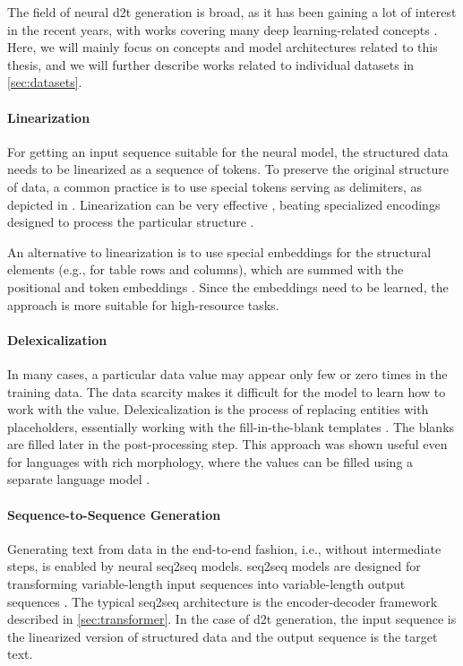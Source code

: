 The field of neural \ac{d2t} generation is broad, as it has been gaining a lot of interest in the recent years, with works covering many deep learning-related concepts \cite{sharmaInnovationsNeuralDatatotext2022, lin2023survey}. Here, we will mainly focus on concepts and model architectures related to this thesis, and we will further describe works related to individual datasets in \autoref{sec:datasets}.


\paragraph{Linearization} For getting an input sequence suitable for the neural model, the structured data needs to be linearized as a sequence of tokens. To preserve the original structure of data, a common practice is to use special tokens serving as delimiters, as depicted in . Linearization can be very effective \cite{yang2020improving,hoyle2021promoting,xieUnifiedSKGUnifyingMultiTasking2022}, beating specialized encodings designed to process the particular structure \cite{marcheggianiDeepGraphConvolutional2018,koncel-kedziorskiTextGenerationKnowledge2019}.

An alternative to linearization is to use special embeddings for the structural elements (e.g., for table rows and columns), which are summed with the positional and token embeddings \cite{wang2021tuta,yangTableFormerRobustTransformer2022}. Since the embeddings need to be learned, the approach is more suitable for high-resource tasks.

\paragraph{Delexicalization} In many cases, a particular data value may appear only few or zero times in the training data. The data scarcity makes it difficult for the model to learn how to work with the value. Delexicalization is the process of replacing entities with placeholders, essentially working with the fill-in-the-blank templates \cite{oh2000stochastic,mairesse2010phrase,wen2015semantically,dusekSequencetoSequenceGenerationSpoken2016}.  The blanks are filled later in the post-processing step. This approach was shown useful even for languages with rich morphology, where the values can be filled using a separate language model \cite{duvsek2019neural}.

\paragraph{Sequence-to-Sequence Generation} Generating text from data in the end-to-end fashion, i.e., without intermediate steps, is enabled by neural \ac{seq2seq} models. \Ac{seq2seq} models are designed for transforming variable-length input sequences into variable-length output sequences \cite{cho2014learning,sutskever2014sequence}. The typical \ac{seq2seq} architecture is the encoder-decoder framework described in \autoref{sec:transformer}. In the case of \ac{d2t} generation, the input sequence is the linearized version of structured data and the output sequence is the target text.

